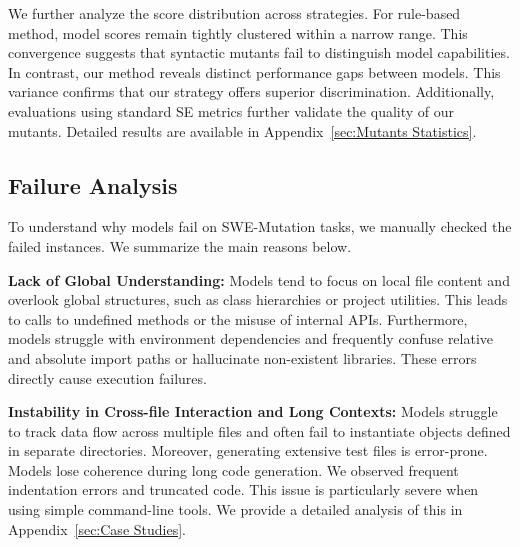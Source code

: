 \documentclass[11pt]{article}
\begin{document}
We further analyze the score distribution across strategies. For rule-based method, model scores remain tightly clustered within a narrow range. This convergence suggests that syntactic mutants fail to distinguish model capabilities. In contrast, our method reveals distinct performance gaps between models. This variance confirms that our strategy offers superior discrimination. Additionally, evaluations using standard SE metrics further validate the quality of our mutants. Detailed results are available in Appendix~\ref{sec:Mutants Statistics}.

\subsection{Failure Analysis}
\label{sec:failure_analysis}
To understand why models fail on SWE-Mutation tasks, we manually checked the failed instances. We summarize the main reasons below.

\textbf{Lack of Global Understanding:} Models tend to focus on local file content and overlook global structures, such as class hierarchies or project utilities. This leads to calls to undefined methods or the misuse of internal APIs. Furthermore, models struggle with environment dependencies and frequently confuse relative and absolute import paths or hallucinate non-existent libraries. These errors directly cause execution failures.

\textbf{Instability in Cross-file Interaction and Long Contexts:} Models struggle to track data flow across multiple files and often fail to instantiate objects defined in separate directories. Moreover, generating extensive test files is error-prone. Models lose coherence during long code generation. We observed frequent indentation errors and truncated code. This issue is particularly severe when using simple command-line tools. We provide a detailed analysis of this in Appendix~\ref{sec:Case Studies}.
\end{document}
